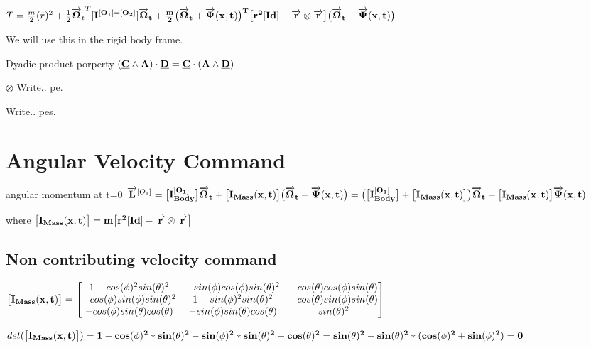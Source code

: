 $T=\frac{m}{2}(\dot r)^2+\frac{1}{2}{\overrightarrow{\bf \Omega}_t}^T[\bf I^{[\bf O_1]=[\bf O_2]}]\overrightarrow{\bf \Omega}_t+\frac{m}{2}\big(\overrightarrow{\bf \Omega}_t+\overrightarrow{\bf \Psi}(x,t)\big)^T\big[r^2 [\bf Id]-\overrightarrow{\bf r}  \otimes \overrightarrow{\bf r} \big]\big(\overrightarrow{\bf \Omega}_t+\overrightarrow{\bf \Psi}(x,t)\big) $

We will use this in the rigid body frame.

Dyadic product porperty $(\underline{\bf C} \wedge \bf A) \cdot \underline{\bf D} =\underline{\bf C} \cdot (\bf A \wedge \underline{\bf D})$

$\otimes$
Write.. \gls{pe}.

Write.. \glspl{pe}.

\section{Angular Velocity Command}
\label{Angular Velocity Command}
angular momentum at t=0
$\overrightarrow{\bf L}^{[O_1]}=\big[\bf I^{[O_1]}_{Body}\big] \overrightarrow{\bf \Omega}_{t} +\big [I_{Mass}(x,t)\big] \big(\overrightarrow{\bf \Omega}_{t}+\overrightarrow{\bf \Psi}(x,t)\big)= \big(\big[\bf I^{[O_1]}_{Body}\big] +\big [I_{Mass}(x,t)\big]\big) \overrightarrow{\bf \Omega}_{t}+\big [I_{Mass}(x,t)\big]\overrightarrow{\bf \Psi}(x,t)$

where $\big[ \bf I_{Mass}(x,t) \big]=m \big[r^2 [\bf Id]-\overrightarrow{\bf r}  \otimes \overrightarrow{\bf r} \big]$

\subsection{Non contributing velocity command}
\label{Non contributing velocity command}
$\big[ \bf I_{Mass}(x,t) \big]=\begin{bmatrix}
1 - cos(\phi)^2sin(\theta)^2 & -sin(\phi)cos(\phi)sin(\theta)^2 & -cos(\theta)cos(\phi)sin(\theta) \\ -cos(\phi)sin(\phi)sin(\theta)^2 & 1 - sin(\phi)^2sin(\theta)^2 & -cos(\theta)sin(\phi)sin(\theta) \\ -cos(\phi)sin(\theta)cos(\theta) & -sin(\phi)sin(\theta)cos(\theta) & sin(\theta)^2
\end{bmatrix}$

$det(\big[ \bf {I_{Mass}(x,t)} \big])=1 - cos(\phi)^2*sin(\theta)^2 - sin(\phi)^2*sin(\theta)^2 - cos(\theta)^2 
=  sin(\theta)^2 -  sin(\theta)^2*(cos(\phi)^2+sin(\phi)^2) = 0$

